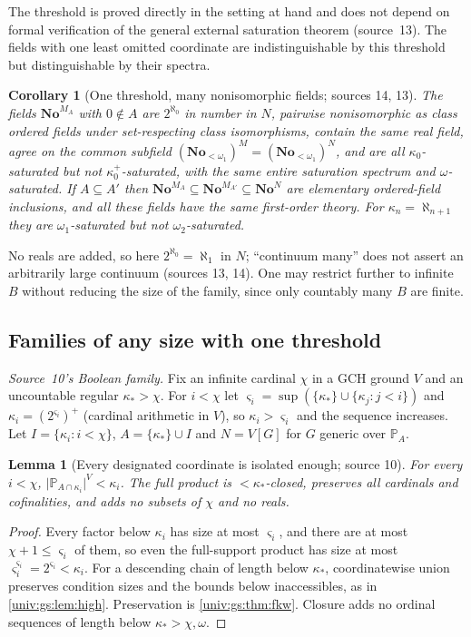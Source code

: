 \documentclass[11pt,letterpaper]{article}
\numberwithin{equation}{section}
\newtheorem{lemma}[lemma]{Lemma}
\newtheorem{corollary}[corollary]{Corollary}
\theoremstyle{definition}
\theoremstyle{remark}
\newcommand{\No}{\mathbf{No}}
\newcommand{\abs}[1]{\lvert#1\rvert}
\begin{document}
The threshold is proved directly in the setting at hand and does not depend on formal
verification of the general external saturation theorem (source~13). The fields with one
least omitted coordinate are indistinguishable by this threshold but distinguishable by
their spectra.

\begin{corollary}[One threshold, many nonisomorphic fields; sources 14, 13]\label{univ:gs:cor:onethreshold}
The fields $\No^{M_A}$ with $0\notin A$ are $2^{\aleph_0}$ in number in $N$, pairwise
nonisomorphic as class ordered fields under set-respecting class isomorphisms, contain the
same real field, agree on the common subfield $(\No_{<\omega_1})^M=(\No_{<\omega_1})^N$, and
are all $\kappa_0$-saturated but not $\kappa_0^+$-saturated, with the same entire saturation
spectrum and $\omega$-saturated. If $A\subseteq A'$ then
$\No^{M_A}\subseteq\No^{M_{A'}}\subseteq\No^N$ are elementary ordered-field inclusions, and all
these fields have the same first-order theory. For $\kappa_n=\aleph_{n+1}$ they are
$\omega_1$-saturated but not $\omega_2$-saturated.
\end{corollary}

No reals are added, so here $2^{\aleph_0}=\aleph_1$ in $N$; ``continuum many'' does not
assert an arbitrarily large continuum (sources 13, 14). One may restrict further to infinite
$B$ without reducing the size of the family, since only countably many $B$ are finite.

\subsection{Families of any size with one threshold}

\emph{Source~10's Boolean family.} Fix an infinite cardinal $\chi$ in a GCH ground $V$ and an
uncountable regular $\kappa_*>\chi$. For $i<\chi$ let
$\varsigma_i=\sup(\{\kappa_*\}\cup\{\kappa_j:j<i\})$ and $\kappa_i=(2^{\varsigma_i})^+$
(cardinal arithmetic in $V$), so $\kappa_i>\varsigma_i$ and the sequence increases. Let
$I=\{\kappa_i:i<\chi\}$, $A=\{\kappa_*\}\cup I$ and $N=V[G]$ for $G$ generic over
$\mathbb P_A$.

\begin{lemma}[Every designated coordinate is isolated enough; source 10]\label{univ:gs:lem:sparsesize}
For every $i<\chi$, $\abs{\mathbb P_{A\cap\kappa_i}}^V<\kappa_i$. The full product is
$<\kappa_*$-closed, preserves all cardinals and cofinalities, and adds no subsets of $\chi$
and no reals.
\end{lemma}
\begin{proof}
Every factor below $\kappa_i$ has size at most $\varsigma_i$, and there are at most
$\chi+1\le\varsigma_i$ of them, so even the full-support product has size at most
$\varsigma_i^{\varsigma_i}=2^{\varsigma_i}<\kappa_i$. For a descending chain of length
below $\kappa_*$, coordinatewise union preserves condition sizes and the bounds below
inaccessibles, as in \cref{univ:gs:lem:high}. Preservation is \cref{univ:gs:thm:fkw}.
Closure adds no ordinal sequences of length below $\kappa_*>\chi,\omega$.
\end{proof}
\end{document}
